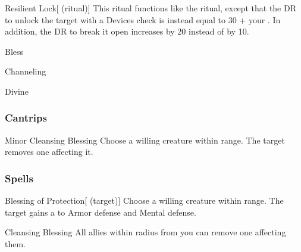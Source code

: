 \lowercase{\hypertarget{spell:Resilient Lock}{}}\label{spell:Resilient Lock}
\begin{attuneability}[\nth{4}]{\hypertarget{spell:Resilient Lock}{Resilient Lock}}[ (ritual)]
This ritual functions like the  ritual, except that the DR to unlock the target with a Devices check is instead equal to 30 + your .
In addition, the DR to break it open increases by 20 instead of by 10.
\end{attuneability}
\vspace{0.25em}


\newpage
\begin{spellsection}{Bless}

\begin{spellheader}
\end{spellheader}


 Channeling

 Divine

\subsubsection{Cantrips}


\begin{freeability}{Minor Cleansing Blessing}
Choose a willing creature within \rngclose range.
The target removes one  affecting it.
\end{freeability}

\end{spellsection}


\subsubsection{Spells}


\lowercase{\hypertarget{spell:Blessing of Protection}{}}\label{spell:Blessing of Protection}
\begin{attuneability}[\nth{1}]{\hypertarget{spell:Blessing of Protection}{Blessing of Protection}}[ (target)]
Choose a willing creature within \rngclose range.
The target gains a   to Armor defense and Mental defense.
\end{attuneability}
\vspace{0.25em}



\lowercase{\hypertarget{spell:Cleansing Blessing}{}}\label{spell:Cleansing Blessing}
\begin{apability}[\nth{1}]{\hypertarget{spell:Cleansing Blessing}{Cleansing Blessing}}
All allies within \arealarge radius from you can remove one  affecting them.
\end{apability}
\vspace{0.25em}



